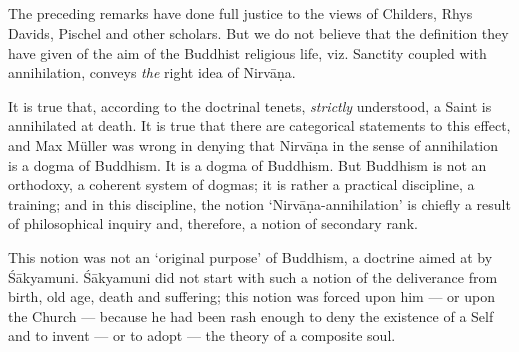 \documentclass[a4paper, 11pt, oneside, english, landscape]{article}
\begin{document}
\subsection{}
\paragraph{}
The preceding remarks have done full justice to the views of Childers, Rhys Davids, Pischel and other scholars. But we do not believe that the definition they have given of the aim of the Buddhist religious life, viz. Sanctity coupled with annihilation, conveys \emph{the} right idea of Nirvāṇa.

It is true that, according to the doctrinal tenets, \emph{strictly} understood, a Saint is annihilated at death. It is true that there are categorical statements to this effect, and Max Müller was wrong in denying that Nirvāṇa in the sense of annihilation is a dogma of Buddhism. It is a dogma of Buddhism. But Buddhism is not an orthodoxy, a coherent system of dogmas; it is rather a practical discipline, a training; and in this discipline, the notion `Nirvāṇa-annihilation' is chiefly a result of philosophical inquiry and, therefore, a notion of secondary rank.

This notion was not an `original purpose' of Buddhism, a doctrine aimed at by Śākyamuni. Śākyamuni did not start with such a notion of the deliverance from birth, old age, death and suffering; this notion was forced upon him --- or upon the Church --- because he had been rash enough to deny the existence of a Self and to invent --- or to adopt --- the theory of a composite soul.
\end{document}
